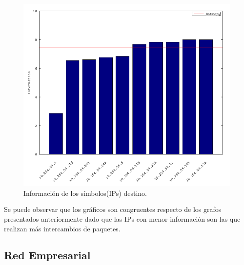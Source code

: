 \documentclass[10pt, a4paper]{article}
\begin{document}
\begin{itemize}
\begin{figure}[H] %
\begin{center}
\includegraphics[width=400pt]{../imgs/starbucks_dst_chartbar.png}
\caption{Información de los símbolos(IPs) destino.}
\end{center}
\end{figure}

\end{itemize}

Se puede observar que los gráficos son congruentes respecto de los grafos presentados anteriormente dado que las IPs con menor información son las que realizan más intercambios de paquetes.

\newpage
\subsection{Red Empresarial}
\end{document}
